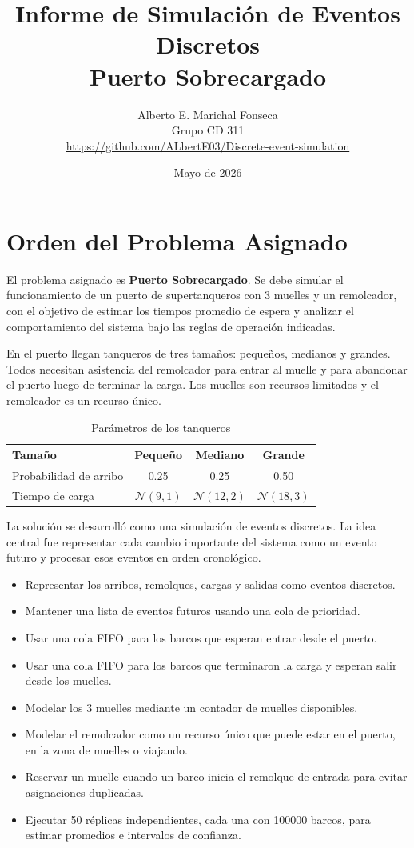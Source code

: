 \documentclass[12pt]{article}
\title{Informe de Simulación de Eventos Discretos\\Puerto Sobrecargado}
\author{Alberto E. Marichal Fonseca\\Grupo CD 311 \\ \url{https://github.com/ALbertE03/Discrete-event-simulation} }
\date{Mayo de 2026}
\begin{document}
\maketitle

\section{Orden del Problema Asignado}

El problema asignado es \textbf{Puerto Sobrecargado}. Se debe simular el funcionamiento de un puerto de supertanqueros con 3 muelles y un remolcador, con el objetivo de estimar los tiempos promedio de espera y analizar el comportamiento del sistema bajo las reglas de operación indicadas.

En el puerto llegan tanqueros de tres tamaños: pequeños, medianos y grandes. Todos necesitan asistencia del remolcador para entrar al muelle y para abandonar el puerto luego de terminar la carga. Los muelles son recursos limitados y el remolcador es un recurso único.

\begin{table}[H]
\centering
\caption{Parámetros de los tanqueros}
\begin{tabular}{lccc}
\toprule
\textbf{Tamaño} & \textbf{Pequeño} & \textbf{Mediano} & \textbf{Grande} \\
\midrule
Probabilidad de arribo & 0.25 & 0.25 & 0.50 \\
Tiempo de carga & $\mathcal{N}(9, 1)$ & $\mathcal{N}(12, 2)$ & $\mathcal{N}(18, 3)$ \\
\bottomrule
\end{tabular}
\end{table}


La solución se desarrolló como una simulación de eventos discretos. La idea central fue representar cada cambio importante del sistema como un evento futuro y procesar esos eventos en orden cronológico.

\begin{itemize}
    \item Representar los arribos, remolques, cargas y salidas como eventos discretos.
    \item Mantener una lista de eventos futuros usando una cola de prioridad.
    \item Usar una cola FIFO para los barcos que esperan entrar desde el puerto.
    \item Usar una cola FIFO para los barcos que terminaron la carga y esperan salir desde los muelles.
    \item Modelar los 3 muelles mediante un contador de muelles disponibles.
    \item Modelar el remolcador como un recurso único que puede estar en el puerto, en la zona de muelles o viajando.
    \item Reservar un muelle cuando un barco inicia el remolque de entrada para evitar asignaciones duplicadas.
    \item Ejecutar 50 réplicas independientes, cada una con 100000 barcos, para estimar promedios e intervalos de confianza.
\end{itemize}
\end{document}
